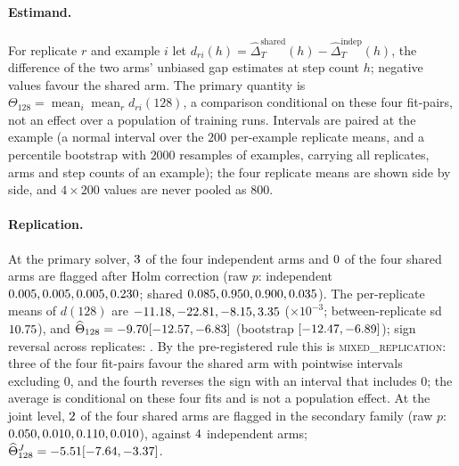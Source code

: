 \documentclass{article}
\theoremstyle{plain}
\theoremstyle{definition}
\theoremstyle{remark}
\begin{document}
\paragraph{Estimand.}
For replicate $r$ and example $i$ let $d_{ri}(h)=\widehat\Delta_T^{\text{shared}}(h)-\widehat\Delta_T^{\text{indep}}(h)$, the difference of the two arms' unbiased gap estimates at step count $h$; negative values favour the shared arm.
The primary quantity is $\Theta_{128}=\operatorname{mean}_i\operatorname{mean}_r d_{ri}(128)$, a comparison conditional on these four fit-pairs, not an effect over a population of training runs.
Intervals are paired at the example (a normal interval over the $200$ per-example replicate means, and a percentile bootstrap with $2000$ resamples of examples, carrying all replicates, arms and step counts of an example); the four replicate means are shown side by side, and $4\times200$ values are never pooled as $800$.



\begin{table}[t]
\centering
\caption{Paired between-arm difference at the target level ($\times10^{3}$): per-replicate means $\bar d_r(h)$ with pointwise 95\% CIs, and $\widehat\Theta_h$ over examples (conditional on the four fits) with the example bootstrap; $h=256$ lies between the two columns (\cref{tab:r7thetafull}, appendix).}
\label{tab:r7theta}
\scriptsize
\setlength{\tabcolsep}{2pt}

\end{table}

\paragraph{Replication.}
At the primary solver, $3$ of the four independent arms and $0$ of the four shared arms are flagged after Holm correction (raw $p$: independent $0.005, 0.005, 0.005, 0.230$; shared $0.085, 0.950, 0.900, 0.035$).
The per-replicate means of $d(128)$ are $-11.18, -22.81, -8.15, 3.35$ ($\times10^{-3}$; between-replicate sd $10.75$), and $\widehat\Theta_{128}=-9.70 [-12.57, -6.83]$ (bootstrap $[-12.47, -6.89]$); sign reversal across replicates: \numRsevenReversal.
By the pre-registered rule this is \textsc{mixed\_replication}: three of the four fit-pairs favour the shared arm with pointwise intervals excluding $0$, and the fourth reverses the sign with an interval that includes $0$; the average is conditional on these four fits and is not a population effect.
At the joint level, $2$ of the four shared arms are flagged in the secondary family (raw $p$: $0.050, 0.010, 0.110, 0.010$), against $4$ independent arms; $\widehat\Theta_{128}^{J}=-5.51 [-7.64, -3.37]$.
\end{document}
